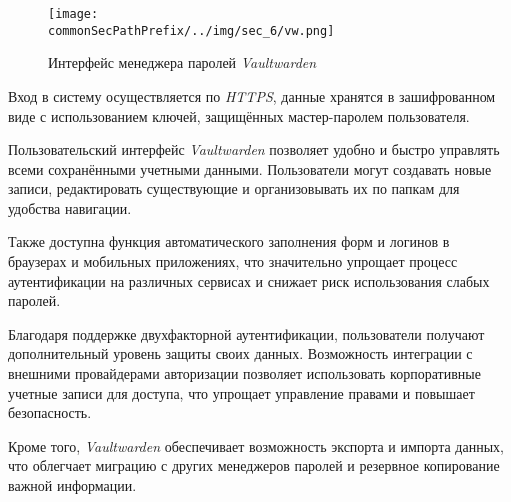 \begin{figure}[ht]
    \centering
    \texttt{[image: \\commonSecPathPrefix/../img/sec\_6/vw.png]}
    \caption{Интерфейс менеджера паролей \textit{Vaultwarden}}
    \label{fig:user_guide:vw}
\end{figure}

Вход в систему осуществляется по \textit{HTTPS}, данные хранятся в зашифрованном виде с использованием ключей, защищённых мастер-паролем пользователя.

Пользовательский интерфейс \textit{Vaultwarden} позволяет удобно и быстро управлять всеми сохранёнными учетными данными. Пользователи могут создавать новые записи, редактировать существующие и организовывать их по папкам для удобства навигации.

Также доступна функция автоматического заполнения форм и логинов в браузерах и мобильных приложениях, что значительно упрощает процесс аутентификации на различных сервисах и снижает риск использования слабых паролей.

Благодаря поддержке двухфакторной аутентификации, пользователи получают дополнительный уровень защиты своих данных. Возможность интеграции с внешними провайдерами авторизации позволяет использовать корпоративные учетные записи для доступа, что упрощает управление правами и повышает безопасность.

Кроме того, \textit{Vaultwarden} обеспечивает возможность экспорта и импорта данных, что облегчает миграцию с других менеджеров паролей и резервное копирование важной информации.
